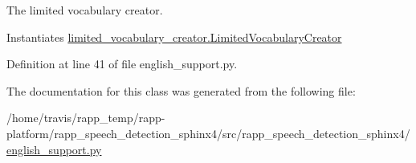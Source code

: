 The limited vocabulary creator. 

Instantiates \hyperlink{classrapp__speech__detection__sphinx4_1_1limited__vocabulary__creator_1_1LimitedVocabularyCreator}{limited\-\_\-vocabulary\-\_\-creator.\-Limited\-Vocabulary\-Creator} 

Definition at line 41 of file english\-\_\-support.\-py.



The documentation for this class was generated from the following file\-:\begin{DoxyCompactItemize}
\item 
/home/travis/rapp\-\_\-temp/rapp-\/platform/rapp\-\_\-speech\-\_\-detection\-\_\-sphinx4/src/rapp\-\_\-speech\-\_\-detection\-\_\-sphinx4/\hyperlink{english__support_8py}{english\-\_\-support.\-py}\end{DoxyCompactItemize}
